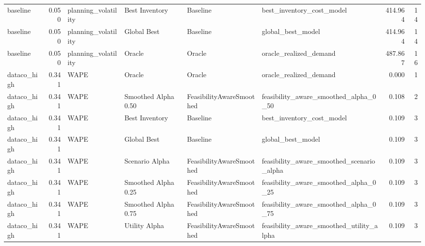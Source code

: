 \begin{table}
{\begin{tabular}{lrllllrr}
      baseline &             0.050 &         planning\_volatility &        Best Inventory &                  Baseline &                          best\_inventory\_cost\_model &       414.964 &              14 \\
      baseline &             0.050 &         planning\_volatility &           Global Best &                  Baseline &                                  global\_best\_model &       414.964 &              14 \\
      baseline &             0.050 &         planning\_volatility &                Oracle &                    Oracle &                             oracle\_realized\_demand &       487.867 &              16 \\
   dataco\_high &             0.341 &                        WAPE &                Oracle &                    Oracle &                             oracle\_realized\_demand &         0.000 &               1 \\
   dataco\_high &             0.341 &                        WAPE &   Smoothed Alpha 0.50 &  FeasibilityAwareSmoothed &              feasibility\_aware\_smoothed\_alpha\_0\_50 &         0.108 &               2 \\
   dataco\_high &             0.341 &                        WAPE &        Best Inventory &                  Baseline &                          best\_inventory\_cost\_model &         0.109 &               3 \\
   dataco\_high &             0.341 &                        WAPE &           Global Best &                  Baseline &                                  global\_best\_model &         0.109 &               3 \\
   dataco\_high &             0.341 &                        WAPE &        Scenario Alpha &  FeasibilityAwareSmoothed &          feasibility\_aware\_smoothed\_scenario\_alpha &         0.109 &               3 \\
   dataco\_high &             0.341 &                        WAPE &   Smoothed Alpha 0.25 &  FeasibilityAwareSmoothed &              feasibility\_aware\_smoothed\_alpha\_0\_25 &         0.109 &               3 \\
   dataco\_high &             0.341 &                        WAPE &   Smoothed Alpha 0.75 &  FeasibilityAwareSmoothed &              feasibility\_aware\_smoothed\_alpha\_0\_75 &         0.109 &               3 \\
   dataco\_high &             0.341 &                        WAPE &         Utility Alpha &  FeasibilityAwareSmoothed &           feasibility\_aware\_smoothed\_utility\_alpha &         0.109 &               3 \\

\end{tabular}}
\end{table}

